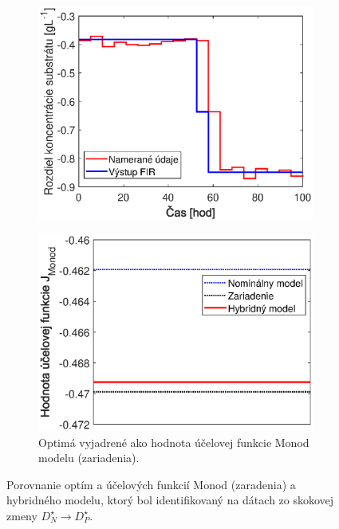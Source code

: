 \begin{figure}
	\centering
	\begin{subfigure}[b]{0.49\textwidth}
		\centering
		\includegraphics[width=\linewidth]{images/hybrid_optShift_data}
		\caption{}
		\label{fig:hybrid_optShift_data}
	\end{subfigure}
	\hfill
	\begin{subfigure}[b]{0.49\textwidth}
		\centering
		\includegraphics[width=\linewidth]{images/hybrid_optShift_costFunValues}
		\caption{Optimá vyjadrené ako hodnota účelovej funkcie Monod modelu (zariadenia).}
		\label{fig:hybrid_optShift_costFunValues}
		\end{subfigure}
	\caption{Porovnanie optím a účelových funkcií Monod (zaradenia) a hybridného modelu, ktorý bol identifikovaný na dátach zo skokovej zmeny $ D_{N}^{\star} \rightarrow D_{P}^{\star} $.}
	\label{fig:hybrid_optimum_shift}
\end{figure}

